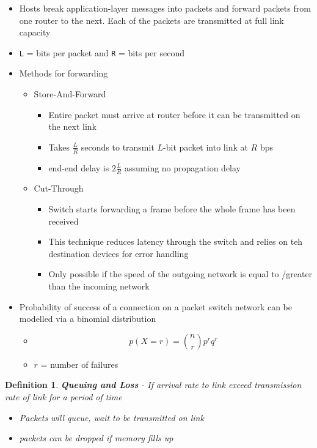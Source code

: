\documentclass[twoside]{article}
\newtheorem{definition}[theorem]{Definition}
\begin{document}
\begin{itemize}
\item Hosts break application-layer messages into packets and forward packets from one router to the next. Each of the packets are transmitted at full link capacity
\item \verb|L| = bits per packet and \verb|R| = bits per second
\item Methods for forwarding
\begin{itemize}
\item Store-And-Forward
\begin{itemize}
\item Entire packet must arrive at router before it can be transmitted on the next link
\item Takes $\frac{L}{R}$ seconds to transmit $L$-bit packet into link at $R$ bps
\item end-end delay is $ 2 \frac{L}{R}$ assuming no propagation delay
\end{itemize}
\item Cut-Through 
\begin{itemize}
\item Switch starts forwarding a frame before the whole frame has been received
\item This technique reduces latency through the switch and relies on teh destination devices for error handling
\item Only possible if the speed of the  outgoing network is equal to /greater than the incoming network
\end{itemize}
\end{itemize}
\item Probability of success of a connection on a packet switch network can be modelled via a binomial distribution
\begin{itemize}
\item $$p(X=r) = {n \choose r } p^r q^r$$
\item $r$ = number of failures
\end{itemize}
\end{itemize}

\begin{definition}
\textbf{Queuing and Loss} - If arrival rate to link exceed transmission rate  of link for a period of time 
\begin{itemize}
\item Packets will queue, wait to be transmitted on link
\item packets can be dropped if memory fills up
\end{itemize}
\end{definition}
\end{document}
